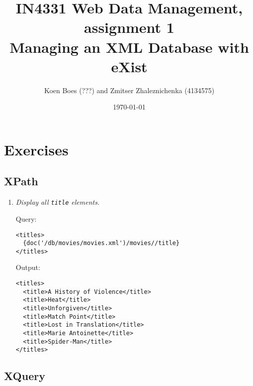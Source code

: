 \documentclass[a4paper, notitlepage]{article}
\begin{document}
\title{IN4331 Web Data Management, assignment 1 \\
Managing an XML Database with eXist}
\author{Koen Boes (???) and Zmitser Zhaleznichenka (4134575)}
\date{\today}
\maketitle

\setcounter{secnumdepth}{0}

\section{Exercises}

\subsection{XPath}

\begin{enumerate}
\item 
  \emph{Display all \lstinline{title} elements.} 
  
Query: 
  
\begin{lstlisting}
<titles>
  {doc('/db/movies/movies.xml')/movies//title}
</titles>
\end{lstlisting}
  
Output:
  
\begin{lstlisting}
<titles>
  <title>A History of Violence</title>
  <title>Heat</title>
  <title>Unforgiven</title>
  <title>Match Point</title>
  <title>Lost in Translation</title>
  <title>Marie Antoinette</title>
  <title>Spider-Man</title>
</titles>
\end{lstlisting}
  
\end{enumerate}

\subsection{XQuery}
\end{document}
